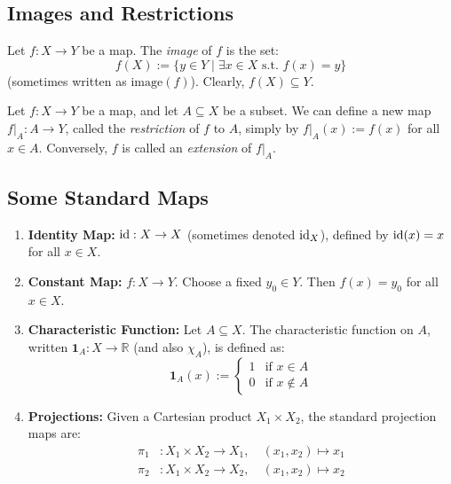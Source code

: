 \subsection{Images and Restrictions}

\begin{definition}
\label{def:image_of_map}
Let $f: X \to Y$ be a map. The \textit{image} of $f$ is the set:
\[
f(X) := \{y \in Y \mid \exists x \in X \text{ s.t. } f(x) = y\}
\]
(sometimes written as $\text{image}(f)$). Clearly, $f(X) \subseteq Y$.
\end{definition}

\begin{definition}
\label{def:restriction}
Let $f: X \to Y$ be a map, and let $A \subseteq X$ be a subset. We can define a new map $f|_A: A \to Y$, called the \textit{restriction} of $f$ to $A$, simply by $f|_A(x) := f(x)$ for all $x \in A$.
Conversely, $f$ is called an \textit{extension} of $f|_A$.
\end{definition}

\subsection{Some Standard Maps}

\begin{example}
\begin{enumerate}
    \item \textbf{Identity Map:} $\operatorname{id}: X \to X$ (sometimes denoted $\operatorname{id}_X$), defined by $\operatorname{id}(x) = x$ for all $x \in X$.
    \item \textbf{Constant Map:} $f: X \to Y$. Choose a fixed $y_0 \in Y$. Then $f(x) = y_0$ for all $x \in X$.
    \item \textbf{Characteristic Function:} Let $A \subseteq X$. The characteristic function on $A$, written $\mathbf{1}_A: X \to \mathbb{R}$ (and also $\chi_A$), is defined as:
    \[
    \mathbf{1}_A(x) :=
    \begin{cases}
    1 & \text{if } x \in A \\
    0 & \text{if } x \notin A
    \end{cases}
    \]
    \item \textbf{Projections:} Given a Cartesian product $X_1 \times X_2$, the standard projection maps are:
    \begin{align*}
    \pi_1&: X_1 \times X_2 \to X_1, \quad (x_1, x_2) \mapsto x_1 \\
    \pi_2&: X_1 \times X_2 \to X_2, \quad (x_1, x_2) \mapsto x_2
    \end{align*}
\end{enumerate}
\end{example}

